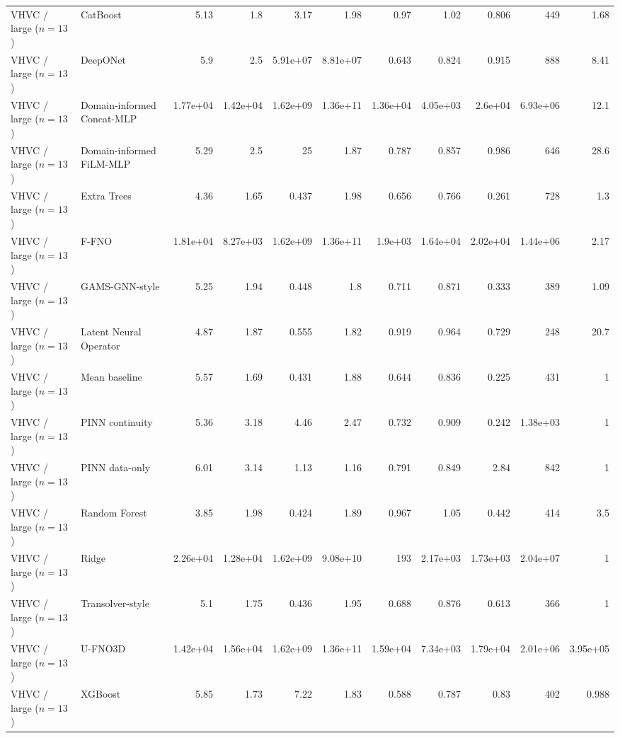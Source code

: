 \begin{landscape}
\begin{longtable}{p{2.8cm}p{3.6cm}rrrrrrrrr}
VHVC / large ($n=13$) & CatBoost & 5.13 & 1.8 & 3.17 & 1.98 & 0.97 & 1.02 & 0.806 & 449 & 1.68 \\
VHVC / large ($n=13$) & DeepONet & 5.9 & 2.5 & 5.91e+07 & 8.81e+07 & 0.643 & 0.824 & 0.915 & 888 & 8.41 \\
VHVC / large ($n=13$) & Domain-informed Concat-MLP & 1.77e+04 & 1.42e+04 & 1.62e+09 & 1.36e+11 & 1.36e+04 & 4.05e+03 & 2.6e+04 & 6.93e+06 & 12.1 \\
VHVC / large ($n=13$) & Domain-informed FiLM-MLP & 5.29 & 2.5 & 25 & 1.87 & 0.787 & 0.857 & 0.986 & 646 & 28.6 \\
VHVC / large ($n=13$) & Extra Trees & 4.36 & 1.65 & 0.437 & 1.98 & 0.656 & 0.766 & 0.261 & 728 & 1.3 \\
VHVC / large ($n=13$) & F-FNO & 1.81e+04 & 8.27e+03 & 1.62e+09 & 1.36e+11 & 1.9e+03 & 1.64e+04 & 2.02e+04 & 1.44e+06 & 2.17 \\
VHVC / large ($n=13$) & GAMS-GNN-style & 5.25 & 1.94 & 0.448 & 1.8 & 0.711 & 0.871 & 0.333 & 389 & 1.09 \\
VHVC / large ($n=13$) & Latent Neural Operator & 4.87 & 1.87 & 0.555 & 1.82 & 0.919 & 0.964 & 0.729 & 248 & 20.7 \\
VHVC / large ($n=13$) & Mean baseline & 5.57 & 1.69 & 0.431 & 1.88 & 0.644 & 0.836 & 0.225 & 431 & 1 \\
VHVC / large ($n=13$) & PINN continuity & 5.36 & 3.18 & 4.46 & 2.47 & 0.732 & 0.909 & 0.242 & 1.38e+03 & 1 \\
VHVC / large ($n=13$) & PINN data-only & 6.01 & 3.14 & 1.13 & 1.16 & 0.791 & 0.849 & 2.84 & 842 & 1 \\
VHVC / large ($n=13$) & Random Forest & 3.85 & 1.98 & 0.424 & 1.89 & 0.967 & 1.05 & 0.442 & 414 & 3.5 \\
VHVC / large ($n=13$) & Ridge & 2.26e+04 & 1.28e+04 & 1.62e+09 & 9.08e+10 & 193 & 2.17e+03 & 1.73e+03 & 2.04e+07 & 1 \\
VHVC / large ($n=13$) & Transolver-style & 5.1 & 1.75 & 0.436 & 1.95 & 0.688 & 0.876 & 0.613 & 366 & 1 \\
VHVC / large ($n=13$) & U-FNO3D & 1.42e+04 & 1.56e+04 & 1.62e+09 & 1.36e+11 & 1.59e+04 & 7.34e+03 & 1.79e+04 & 2.01e+06 & 3.95e+05 \\
VHVC / large ($n=13$) & XGBoost & 5.85 & 1.73 & 7.22 & 1.83 & 0.588 & 0.787 & 0.83 & 402 & 0.988 \\
\bottomrule\end{longtable}\end{landscape}


